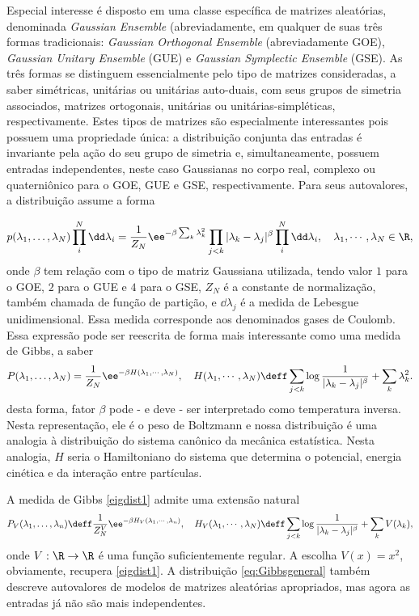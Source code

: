 Especial interesse é disposto em uma classe específica de matrizes aleatórias, denominada \textit{Gaussian Ensemble} (abreviadamente, em qualquer de suas três formas tradicionais:  \textit{Gaussian Orthogonal Ensemble} (abreviadamente GOE), \textit{Gaussian Unitary Ensemble} (GUE) e \textit{Gaussian Symplectic Ensemble} (GSE). As três formas se distinguem essencialmente pelo tipo de matrizes consideradas, a saber simétricas, unitárias ou unitárias auto-duais, com seus grupos de simetria associados, matrizes ortogonais, unitárias ou unitárias-simpléticas, respectivamente. Estes tipos de matrizes são especialmente interessantes pois possuem uma propriedade única: a distribuição conjunta das entradas é invariante pela ação do seu grupo de simetria e, simultaneamente, possuem entradas independentes, neste caso Gaussianas no corpo real, complexo ou quaterniônico para o GOE, GUE e GSE, respectivamente. Para seus autovalores, a distribuição assume a forma

\begin{equation}
	p(\lambda_1, \ldots, \lambda_N) \prod_{i}^{N}\dd \lambda_i = \frac{1}{Z_N} \ee^{-\beta \sum_{k}\lambda_k^2}\prod_{j<k}|\lambda_k - \lambda_j|^\beta \prod_{i}^{N}\dd \lambda_i , \quad \lambda_1,\cdots, \lambda_N\in \R,
	\label{eq: coulomb}
\end{equation}
%
onde $\beta$ tem relação com o tipo de matriz Gaussiana utilizada, tendo valor $1$ para o GOE, $2$ para o GUE e $4$ para o GSE, $Z_N$ é a constante de normalização, também chamada de função de partição, e $\dd\lambda_j$ é a medida de Lebesgue unidimensional. Essa medida corresponde aos denominados gases de Coulomb. Essa expressão pode ser reescrita de forma mais interessante como uma medida de Gibbs, a saber
\begin{equation}\label{eigdist1}
	P(\lambda_1, \ldots, \lambda_N)  = \frac{1}{Z_N} \ee^{-\beta H(\lambda_1,\cdots,\lambda_N)},\quad H(\lambda_1,\cdots,\lambda_N)\deff \sum_{j<k}\log\frac{1}{|\lambda_k - \lambda_j|^\beta}+\sum_{k}\lambda_k^2.
\end{equation}
desta forma, fator $\beta$ pode - e deve - ser interpretado como temperatura inversa. Nesta representação, ele é o peso de Boltzmann e nossa distribuição é uma analogia à distribuição do sistema canônico da mecânica estatística. Nesta analogia, $H$ seria o Hamiltoniano do sistema que determina o potencial, energia cinética e da interação entre partículas.

A medida de Gibbs \eqref{eigdist1} admite uma extensão natural
%
\begin{equation}\label{eq:Gibbsgeneral}
	P_V(\lambda_1,\hdots,\lambda_n)\deff \frac{1}{Z^V_N}\ee^{-\beta H_V(\lambda_1,\cdots, \lambda_n)},\quad H_V(\lambda_1,\cdots,\lambda_N)\deff  \sum_{j<k}\log\frac{1}{|\lambda_k - \lambda_j|^\beta}+\sum_{k}V(\lambda_k),
\end{equation}
%
onde $V:\R\to \R$ é uma função suficientemente regular. A escolha $V(x)=x^2$, obviamente, recupera \eqref{eigdist1}. A distribuição \eqref{eq:Gibbsgeneral} também descreve autovalores de modelos de matrizes aleatórias apropriados, mas agora as entradas já não são mais independentes.